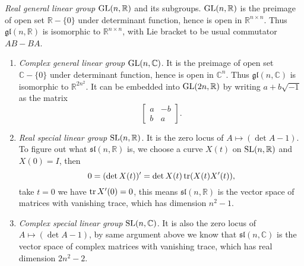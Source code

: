 \begin{eg}\label{linear group 1}
    \emph{Real general linear group} $\mathrm{GL}(n,\mathbb{R})$ and its subgroups.
    $\mathrm{GL}(n,\mathbb{R})$ is the preimage of open set $\mathbb{R}-\{0\}$ under determinant function, hence is open in $\mathbb{R}^{n\times n}$.
    Thus $\mathfrak{gl}(n,\mathbb{R})$ is isomorphic to $\mathbb{R}^{n\times n}$, with Lie bracket to be usual commutator $AB-BA$.
    \begin{enumerate}[(1)]
        \item \emph{Complex general linear group} $\mathrm{GL}(n,\mathbb{C})$.
        It is the preimage of open set $\mathbb{C}-\{0\}$ under determinant function, hence is open in $\mathbb{C}^n$.
        Thus $\mathfrak{gl}(n,\mathbb{C})$ is isomorphic to $\mathbb{R}^{2n^2}$.
        It can be embedded into $\mathrm{GL}(2n,\mathbb{R})$ by writing $a+b\sqrt{-1}$ as the matrix
        \[\begin{bmatrix}
            a & -b \\ b & a
        \end{bmatrix}.\]
        \item \emph{Real special linear group} $\mathrm{SL}(n,\mathbb{R})$.
        It is the zero locus of $A\mapsto(\det{A}-1)$.
        To figure out what $\mathfrak{sl}(n,\mathbb{R})$ is, we choose a curve $X(t)$ on $\mathrm{SL}(n,\mathbb{R})$ and $X(0)=I$, then
        \[0=(\det{X(t)})'=\det{X(t)}\operatorname{tr}(X(t)X'(t)),\]
        take $t=0$ we have $\operatorname{tr}{X'(0)}=0$, this means $\mathfrak{sl}(n,\mathbb{R})$ is the vector space of matrices with vanishing trace, which has dimension $n^2-1$.
        \item \emph{Complex special linear group} $\mathrm{SL}(n,\mathbb{C})$.
        It is also the zero locus of $A\mapsto(\det{A}-1)$, by same argument above we know that $\mathfrak{sl}(n,\mathbb{C})$ is the vector space of complex matrices with vanishing trace, which has real dimension $2n^2-2$.
    \end{enumerate}
\end{eg}


